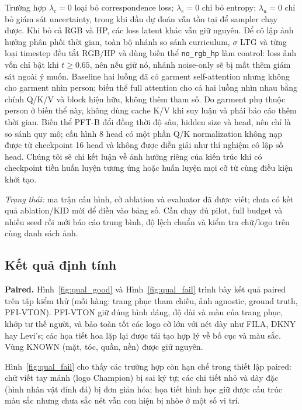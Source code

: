 \documentclass[11pt,a4paper]{article}
\begin{document}
Trường hợp \(\lambda_c=0\) loại bỏ correspondence loss; \(\lambda_e=0\) chỉ bỏ entropy; \(\lambda_u=0\) chỉ bỏ giám sát uncertainty, trong khi đầu dự đoán vẫn tồn tại để sampler chạy được. Khi bỏ cả RGB và HP, các loss latent khác vẫn giữ nguyên. Để cô lập ảnh hưởng phân phối thời gian, toàn bộ nhánh so sánh curriculum, $\sigma$ LTG và từng loại timestep đều tắt RGB/HP và dùng biến thể \texttt{no\_rgb\_hp} làm control: loss ảnh vốn chỉ bật khi \(t\geq0.65\), nên nếu giữ nó, nhánh noise-only sẽ bị mất thêm giám sát ngoài ý muốn. Baseline hai luồng đã có garment self-attention nhưng không cho garment nhìn person; biến thể full attention cho cả hai luồng nhìn nhau bằng chính Q/K/V và block hiện hữu, không thêm tham số. Do garment phụ thuộc person ở biến thể này, không dùng cache K/V khi suy luận và phải báo cáo thêm thời gian. Biến thể PFT-B đổi đồng thời độ sâu, hidden size và head, nên chỉ là so sánh quy mô; cấu hình 8 head có một phần Q/K normalization không nạp được từ checkpoint 16 head và không được diễn giải như thí nghiệm cô lập số head. Chúng tôi sẽ chỉ kết luận về ảnh hưởng riêng của kiến trúc khi có checkpoint tiền huấn luyện tương ứng hoặc huấn luyện mọi cỡ từ cùng điều kiện khởi tạo.

\emph{Trạng thái:} ma trận cấu hình, cờ ablation và evaluator đã được viết; chưa có kết quả ablation/KID mới để điền vào bảng số. Cần chạy đủ pilot, full budget và nhiều seed rồi mới báo cáo trung bình, độ lệch chuẩn và kiểm tra chữ/logo trên cùng danh sách ảnh.

\subsection{Kết quả định tính}

\textbf{Paired.} Hình~\ref{fig:qual_good} và Hình~\ref{fig:qual_fail} trình bày kết quả paired trên tập kiểm thử (mỗi hàng: trang phục tham chiếu, ảnh agnostic, ground truth, PFI-VTON). PFI-VTON giữ đúng hình dáng, độ dài và màu của trang phục, khớp tư thế người, và bảo toàn tốt các logo cỡ lớn với nét dày như FILA, DKNY hay Levi's; các họa tiết hoa lặp lại được tái tạo hợp lý về bố cục và màu sắc. Vùng KNOWN (mặt, tóc, quần, nền) được giữ nguyên.

Hình~\ref{fig:qual_fail} cho thấy các trường hợp còn hạn chế trong thiết lập paired: chữ viết tay mảnh (logo Champion) bị sai ký tự; các chi tiết nhỏ và dày đặc (hình nhân vật đính đá) bị đơn giản hóa; họa tiết hình học giữ được cấu trúc màu sắc nhưng chưa sắc nét vẫn con hiện bị nhòe ở một số vi trí.
\end{document}
